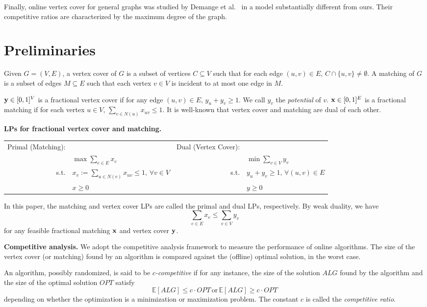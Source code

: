 \documentclass{article}
\newcommand{\bx}{{\bf{x}}}
\newcommand{\by}{{\bf{y}}}
\begin{document}
Finally, online vertex cover for general graphs was studied by Demange et al.~\cite{Demange2005} in a model substantially different from ours. Their competitive ratios are characterized by the maximum degree of the graph.


\section{Preliminaries}


Given $G=(V,E)$, a vertex cover of $G$ is a subset of vertices $C\subseteq V$ such that for each edge $(u,v) \in E$, $C\cap \{u,v\} \neq \emptyset$. A matching of $G$ is a subset of edges $M\subseteq E$ such that each vertex $v \in V$ is incident to at most one edge in $M$.

$\by\in [0,1]^V$ is a fractional vertex cover if for any edge $(u,v)\in E$, $y_u+y_v \geq 1$. We call $y_v$ the {\em potential} of $v$.  $\bx\in [0,1]^E$ is a fractional matching if for each vertex $u\in V$, $\sum_{v\in N(u)} x_{uv} \leq 1$. It is well-known that vertex cover and matching are dual of each other.

{\bf LPs for fractional vertex cover and matching.}

\begin{center}
\begin{tabular}{ | r l | r l | }
\hline
Primal (Matching): & & Dual (Vertex Cover): &\\
 & $\max\sum_{e\in E} x_e$ &  & $\min\sum_{v\in V}y_v$ \\
s.t. & $ x_v:=\sum_{u\in N(v)} x_{uv}\leq 1,\,\forall v\in V$ & s.t. & $y_u+y_v\geq 1,\,\forall (u,v)\in E$ \\
&  $x\geq 0$ & & $y\geq 0$ \\
\hline
\end{tabular}
\end{center}

In this paper, the matching and vertex cover LPs are called the primal and dual LPs, respectively. By weak duality, we have $$\sum_{e\in E} x_e\leq\sum_{v\in V}y_v $$ for any feasible fractional matching $\bx$ and vertex cover $\by$.


{\bf Competitive analysis.}
We adopt the competitive analysis framework to measure the performance of online algorithms. The size of the vertex cover  (or matching) found by an algorithm is compared against the (offline) optimal solution, in the worst case.

An algorithm, possibly randomized, is said to be \textit{$c$-competitive} if for any instance, the size of the solution $ALG$ found by the algorithm and the size of the optimal solution $OPT$ satisfy 
\[
\mathbb{E}[ALG] \leq c\cdot OPT\,\mathrm{ or }\,\mathbb{E}[ALG]\geq  c\cdot OPT
\]
depending on whether the optimization is a minimization or maximization problem. The constant $c$ is called the \textit{competitive ratio}.
\end{document}
